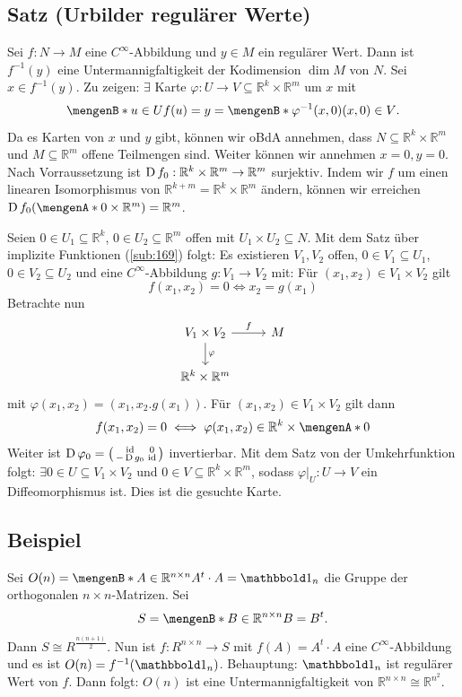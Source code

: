 \subsection{Satz (Urbilder regulärer Werte)} %
\label{sub:167}
Sei $f : N \to M$ eine $C^\infty$-Abbildung und $y \in M$ ein regulärer Wert. Dann ist $f ^{-1}(y)$ eine Untermannigfaltigkeit der Kodimension $\dim M$ von $N$.
Sei $x \in f ^{-1}(y)$. Zu zeigen: $\exists$ Karte $\varphi : U \to V \subseteq \mathds{R}^k \times \mathds{R}^m$ um $x$ mit 
\[
	\set[u \in U]{f(u)=y} = \set[\varphi ^{-1} (x,0)]{(x,0) \in V}.
\]
Da es Karten von $x$ und $y$ gibt, können wir oBdA annehmen, dass $N \subseteq \mathds{R}^k \times \mathds{R}^m$ und $M \subseteq \mathds{R}^m$ offene Teilmengen sind.
Weiter können wir annehmen $x=0, y=0$. Nach Vorraussetzung ist $\operatorname{D} f_0 : \mathbb{R}^k \times \mathbb{R}^m \to \mathbb{R}^m$ surjektiv. Indem wir $f$ um einen linearen
Isomorphismus von $\mathds{R}^{k+m} = \mathds{R}^k \times \mathds{R}^m$ ändern, können wir erreichen $\D f_0 \enbrace*{\set{0} \times \mathds{R}^m } = \mathds{R}^m$.

Seien $0\in U_1 \subseteq \mathds{R}^k$, $0 \in U_2 \subseteq \mathds{R}^m$ offen mit $U_1 \times U_2 \subseteq N$. Mit dem Satz über implizite Funktionen (\ref{sub:169})
folgt: Es existieren $V_1, V_2$ offen, $0 \in V_1 \subseteq U_1$, $0 \in V_2 \subseteq U_2$ und eine $C^\infty$-Abbildung $g : V_1 \to V_2$  mit: Für 
$(x_1, x_2) \in V_1 \times V_2$ gilt
\[
	f(x_1, x_2) = 0 \iff x_2 = g(x_1)
\]
Betrachte nun
\[
	\begin{tikzcd}
		V_1 \times V_2 \rar["f"]  \dar["\varphi"]& M \\
		\mathds{R}^k \times \mathds{R}^m
	\end{tikzcd}
\]
mit $\varphi(x_1, x_2) = (x_1, x_2 . g(x_1))$. Für $(x_1, x_2) \in V_1 \times V_2$ gilt dann
\[
	f(x_1, x_2) = 0 \iff \varphi(x_1, x_2) \in \mathds{R}^k \times \set{0} 
\]
Weiter ist $\operatorname{D} \varphi_0 = \begin{psmallmatrix}
	\operatorname{id} & 0 \\
	-\operatorname{D} g_0 & \operatorname{id}
\end{psmallmatrix}$ invertierbar. Mit dem Satz von der Umkehrfunktion folgt: $\exists 0 \in U \subseteq V_1 \times V_2$ und $0 \in V \subseteq \mathds{R}^k \times \mathds{R}^m$, sodass $\varphi \big|_{U} : U \to V$ ein Diffeomorphismus ist. Dies ist die gesuchte Karte. \bewende

\subsection[Beispielanwendung von \ref{sub:167} für die orthogonalen Matrizen]{Beispiel} %
\label{sub:168}
Sei $O(n) = \set[A \in \mathds{R}^{n \times n}]{ A^t \cdot A= \ind_n}$ die Gruppe der orthogonalen $n \times n$-Matrizen. Sei 
\[
	S = \set[B \in \mathds{R}^{n \times n}]{B = B^t}. 
\]
Dann $S \cong R^{\frac{n(n+1)}{2}}$. Nun ist $f : R^{n \times n} \to S$ mit $f(A)= A^t \cdot A$ eine 
$C^\infty$-Abbildung und es ist $O(n) = f ^{-1}(\ind_n)$. 
Behauptung: $\ind_n$ ist regulärer Wert von $f$. Dann folgt: $O(n)$ ist eine Untermannigfaltigkeit von $\mathds{R}^{n \times n} \cong \mathds{R}^{n^2}$.


